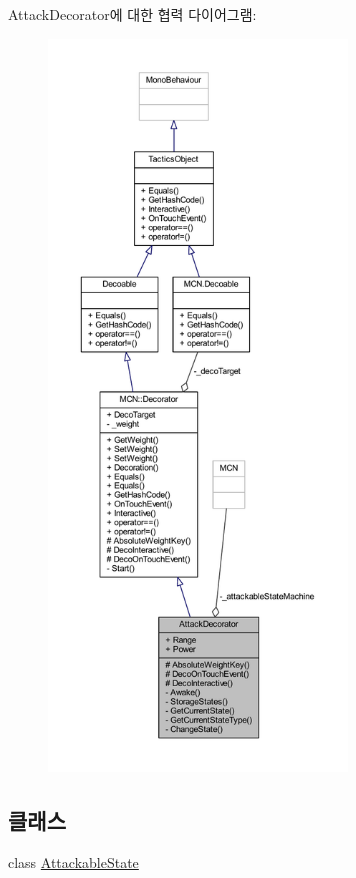 Attack\+Decorator에 대한 협력 다이어그램\+:
\nopagebreak
\begin{figure}[H]
\begin{center}
\leavevmode
\includegraphics[height=550pt]{class_attack_decorator__coll__graph}
\end{center}
\end{figure}
\subsection*{클래스}
\begin{DoxyCompactItemize}
\item 
class \hyperlink{class_attack_decorator_1_1_attackable_state}{Attackable\+State}
\end{DoxyCompactItemize}
